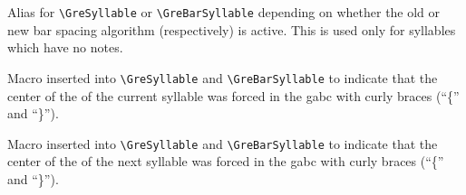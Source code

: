 Alias for \verb=\GreSyllable= or \verb=\GreBarSyllable= depending on whether the old or new bar spacing algorithm (respectively) is active.  This is used only for syllables which have no notes.

Macro inserted into \verb=\GreSyllable= and \verb=\GreBarSyllable= to indicate that the center of the of the current syllable was forced in the gabc with curly braces (``\{'' and ``\}'').

Macro inserted into \verb=\GreSyllable= and \verb=\GreBarSyllable= to indicate that the center of the of the next syllable was forced in the gabc with curly braces (``\{'' and ``\}'').


